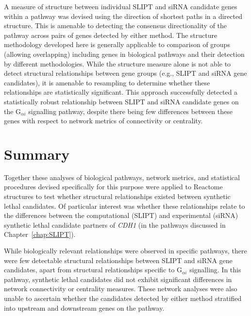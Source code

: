 A measure of  structure between individual \gls{SLIPT} and \gls{siRNA} candidate genes within a \gls{pathway} was devised using the direction of \glspl{shortest path} in a directed  structure. This is amenable to detecting the consensus directionality of the \gls{pathway} across pairs of genes detected by either method. The  structure methodology developed here is generally applicable to comparison of  groups (allowing overlapping) including genes in biological \glspl{pathway} and their detection by different methodologies. While the  structure measure alone is not able to detect structural relationships between gene groups (e.g., \gls{SLIPT} and \gls{siRNA} gene candidates), it is amenable to resampling to determine whether these relationships are statistically significant. This approach successfully detected a statistically robust relationship between \gls{SLIPT} and \gls{siRNA} candidate genes on the G$_{\alpha i}$ signalling \gls{pathway}, despite there being few differences between these genes with respect to network metrics of connectivity or centrality.

\section{Summary}

Together these analyses of biological \glspl{pathway}, network metrics, and statistical procedures devised specifically for this purpose were applied to Reactome  structures to test whether structural relationships existed between \gls{synthetic lethal} candidates. Of particular interest was whether these relationships relate to the differences between the computational (\gls{SLIPT}) and experimental (\gls{siRNA}) \gls{synthetic lethal} candidate partners of \textit{CDH1} (in the \glspl{pathway} discussed in Chapter~\ref{chap:SLIPT}).

While biologically relevant relationships were observed in specific \glspl{pathway}, there were few detectable structural relationships between \gls{SLIPT} and \gls{siRNA} gene candidates, apart from structural relationships specific to G$_{\alpha i}$ signalling. In this \gls{pathway}, \gls{synthetic lethal} candidates did not exhibit significant differences in network connectivity or \gls{centrality} measures. These network analyses were also unable to ascertain whether the candidates detected by either method stratified into upstream and downstream genes on the \gls{pathway}. %

